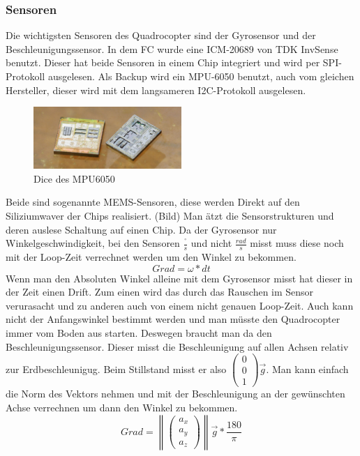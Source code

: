 \documentclass[12pt,a4paper, ngerman]{article}
\begin{document}
\subsubsection{Sensoren}
Die wichtigsten Sensoren des Quadrocopter sind der Gyrosensor und der Beschleunigungssensor. In dem FC wurde eine ICM-20689 von TDK InvSense benutzt. Dieser hat beide Sensoren in einem Chip integriert und wird per SPI-Protokoll ausgelesen. Als Backup wird ein MPU-6050 benutzt, auch vom gleichen Hersteller, dieser wird mit dem langsameren I2C-Protokoll ausgelesen. \\

\begin{figure}
\centering
\includegraphics[width=0.5\textwidth]{1920px-Mpu6050-HD.jpg}
\caption[https://de.wikipedia.org/wiki/TDK]{Dice des MPU6050}
\end{figure}
Beide sind sogenannte MEMS-Sensoren, diese werden Direkt auf den Siliziumwaver der Chips realisiert. (Bild) Man ätzt die Sensorstrukturen und deren auslese Schaltung auf einen Chip. 
\newpage
Da der Gyrosensor nur Winkelgeschwindigkeit, bei den Sensoren $\frac{^\circ}{s}$ und nicht $\frac{rad}{s}$ misst muss diese noch mit der Loop-Zeit verrechnet werden um den Winkel zu bekommen.
\begin{equation}
Grad=\omega*dt
\end{equation}
Wenn man den Absoluten Winkel alleine mit dem Gyrosensor misst hat dieser in der Zeit einen Drift. Zum einen wird das durch das Rauschen im Sensor verurasacht und zu anderen auch von einem nicht genauen Loop-Zeit. Auch kann nicht der Anfangswinkel bestimmt werden und man müsste den Quadrocopter immer vom Boden aus starten. Deswegen braucht man da den Beschleunigungssensor. Dieser misst die Beschleunigung auf allen Achsen relativ zur Erdbeschleunigug. Beim Stillstand misst er also
$
\begin{pmatrix}
0\\ 
0\\ 
1
\end{pmatrix}
\vec{g}
$. Man kann einfach die Norm des Vektors nehmen und mit der Beschleunigung an der gewünschten Achse verrechnen um dann den Winkel zu bekommen.
\begin{equation}
Grad=
\left \|
\begin{pmatrix}
a_{x}\\ 
a_{y}\\ 
a_{z}
\end{pmatrix}
\right \|
\vec{g}*\frac{180}{\pi}
\end{equation}
\end{document}
